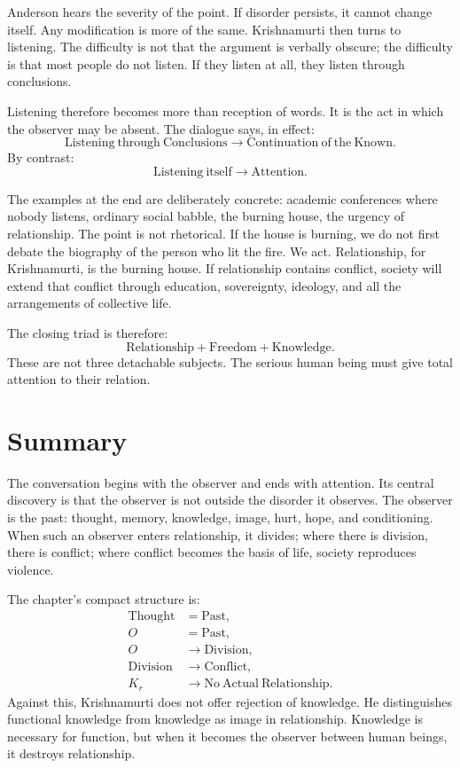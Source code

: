 Anderson hears the severity of the point. If disorder persists, it cannot change itself. Any modification is more of the same. Krishnamurti then turns to listening. The difficulty is not that the argument is verbally obscure; the difficulty is that most people do not listen. If they listen at all, they listen through conclusions.

Listening therefore becomes more than reception of words. It is the act in which the observer may be absent. The dialogue says, in effect:
\begin{equation}
\mathrm{Listening\ through\ Conclusions}
\longrightarrow
\mathrm{Continuation\ of\ the\ Known}.
\end{equation}
By contrast:
\begin{equation}
\mathrm{Listening\ itself}
\longrightarrow
\mathrm{Attention}.
\end{equation}

The examples at the end are deliberately concrete: academic conferences where nobody listens, ordinary social babble, the burning house, the urgency of relationship. The point is not rhetorical. If the house is burning, we do not first debate the biography of the person who lit the fire. We act. Relationship, for Krishnamurti, is the burning house. If relationship contains conflict, society will extend that conflict through education, sovereignty, ideology, and all the arrangements of collective life.

The closing triad is therefore:
\begin{equation}
\mathrm{Relationship}+\mathrm{Freedom}+\mathrm{Knowledge}.
\end{equation}
These are not three detachable subjects. The serious human being must give total attention to their relation.

\section{Summary}

The conversation begins with the observer and ends with attention. Its central discovery is that the observer is not outside the disorder it observes. The observer is the past: thought, memory, knowledge, image, hurt, hope, and conditioning. When such an observer enters relationship, it divides; where there is division, there is conflict; where conflict becomes the basis of life, society reproduces violence.

The chapter's compact structure is:
\begin{align}
\mathrm{Thought} &= \mathrm{Past},\\
O &= \mathrm{Past},\\
O &\longrightarrow \mathrm{Division},\\
\mathrm{Division} &\longrightarrow \mathrm{Conflict},\\
K_r &\longrightarrow \mathrm{No\ Actual\ Relationship}.
\end{align}
Against this, Krishnamurti does not offer rejection of knowledge. He distinguishes functional knowledge from knowledge as image in relationship. Knowledge is necessary for function, but when it becomes the observer between human beings, it destroys relationship.

